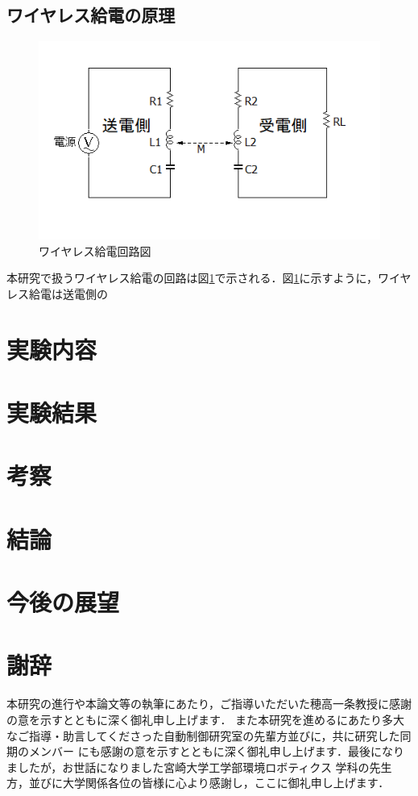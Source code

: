 \documentclass[12pt]{jarticle}
\begin{document}
\subsection{ワイヤレス給電の原理}
\begin{figure}[h]
	\centering
	\includegraphics[]{wpt_2020128.png}
	\caption{ワイヤレス給電回路図}
	\label{fig:wpt_kairo}
\end{figure}
本研究で扱うワイヤレス給電の回路は図\ref{fig:wpt_kairo}で示される．図\ref{fig:wpt_kairo}に示すように，ワイヤレス給電は送電側の
\section{実験内容}

\section{実験結果}

\section{考察}

\section{結論}

\section{今後の展望}

\clearpage
\section{謝辞}
 本研究の進行や本論文等の執筆にあたり，ご指導いただいた穂高一条教授に感謝の意を示すとともに深く御礼申し上げます．
また本研究を進めるにあたり多大なご指導・助言してくださった自動制御研究室の先輩方並びに，共に研究した同期のメンバー
にも感謝の意を示すとともに深く御礼申し上げます．最後になりましたが，お世話になりました宮崎大学工学部環境ロボティクス
学科の先生方，並びに大学関係各位の皆様に心より感謝し，ここに御礼申し上げます．
\end{document}
